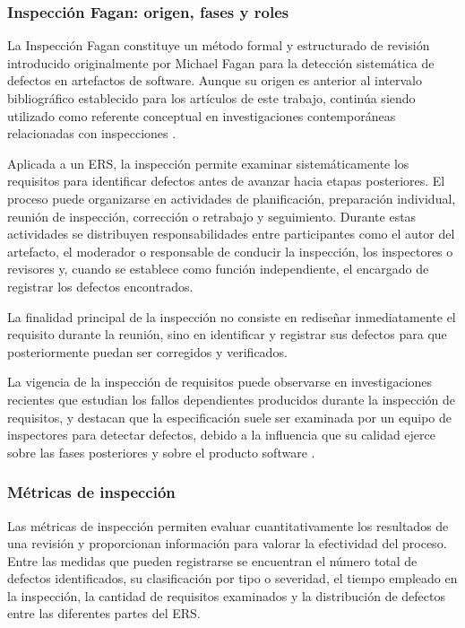 \documentclass[journal,onecolumn]{IEEEtran}
\begin{document}
	\subsubsection{Inspección Fagan: origen, fases y roles}
	
	La Inspección Fagan constituye un método formal y estructurado de revisión introducido originalmente por Michael Fagan para la detección sistemática de defectos en artefactos de software. Aunque su origen es anterior al intervalo bibliográfico establecido para los artículos de este trabajo, continúa siendo utilizado como referente conceptual en investigaciones contemporáneas relacionadas con inspecciones \cite{Li2023}.
	
	Aplicada a un ERS, la inspección permite examinar sistemáticamente los requisitos para identificar defectos antes de avanzar hacia etapas posteriores. El proceso puede organizarse en actividades de planificación, preparación individual, reunión de inspección, corrección o retrabajo y seguimiento. Durante estas actividades se distribuyen responsabilidades entre participantes como el autor del artefacto, el moderador o responsable de conducir la inspección, los inspectores o revisores y, cuando se establece como función independiente, el encargado de registrar los defectos encontrados.
	
	La finalidad principal de la inspección no consiste en rediseñar inmediatamente el requisito durante la reunión, sino en identificar y registrar sus defectos para que posteriormente puedan ser corregidos y verificados.
	
	La vigencia de la inspección de requisitos puede observarse en investigaciones recientes que estudian los fallos dependientes producidos durante la inspección de requisitos, y destacan que la especificación suele ser examinada por un equipo de inspectores para detectar defectos, debido a la influencia que su calidad ejerce sobre las fases posteriores y sobre el producto software \cite{Li2023}.
	
	\subsubsection{Métricas de inspección}
	
	Las métricas de inspección permiten evaluar cuantitativamente los resultados de una revisión y proporcionan información para valorar la efectividad del proceso. Entre las medidas que pueden registrarse se encuentran el número total de defectos identificados, su clasificación por tipo o severidad, el tiempo empleado en la inspección, la cantidad de requisitos examinados y la distribución de defectos entre las diferentes partes del ERS.
	
\end{document}
